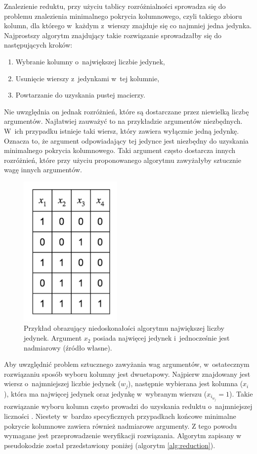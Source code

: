 Znalezienie reduktu,
przy użyciu tablicy rozróżnialności sprowadza się do problemu znalezienia minimalnego pokrycia kolumnowego,
czyli takiego zbioru kolumn,
dla którego w~każdym z~wierszy znajduje się co najmniej jedna jedynka.
Najprostszy algorytm znajdujący takie rozwiązanie sprowadzałby się do następujących kroków:
\begin{enumerate}
\item Wybranie kolumny o~największej liczbie jedynek,
\item Usunięcie wierszy z~jedynkami w~tej kolumnie,
\item Powtarzanie do uzyskania pustej macierzy.
\end{enumerate}

Nie uwzględnia on jednak rozróżnień,
które są dostarczane przez niewielką liczbę argumentów.
Najłatwiej zauważyć to na przykładzie argumentów niezbędnych.
W~ich przypadku istnieje taki wiersz,
który zawiera wyłącznie jedną jedynkę.
Oznacza to,
że argument odpowiadający tej jedynce jest niezbędny do uzyskania minimalnego pokrycia kolumnowego.
Taki argument często dostarcza innych rozróżnień,
które przy użyciu proponowanego algorytmu zawyżałyby sztucznie wagę innych argumentów.

\begin{figure}[H]
\centering
\includegraphics[width = 5cm]{chapter02/required-arguments.png}
\caption{Przykład obrazujący niedoskonałości algorytmu największej liczby jedynek.
Argument $x_2$ posiada najwięcej jedynek i~jednocześnie jest nadmiarowy (źródło własne).}
\end{figure}

Aby uwzględnić problem sztucznego zawyżania wag argumentów,
w~ostatecznym rozwiązaniu sposób wyboru kolumny jest dwuetapowy.
Najpierw znajdowany jest wiersz o~najmniejszej liczbie jedynek ($w_j$),
następnie wybierana jest kolumna ($x_i$),
która ma najwięcej jedynek oraz jedynkę w~wybranym wierszu ($x_{i_{w_j}} = 1$).
Takie rozwiązanie wyboru kolumn często prowadzi do uzyskania reduktu o~najmniejszej liczności \cite{unate-artykul}.
Niestety w~bardzo specyficznych przypadkach końcowe minimalne pokrycie kolumnowe zawiera również nadmiarowe argumenty.
Z tego powodu wymagane jest przeprowadzenie weryfikacji rozwiązania.
Algorytm zapisany w pseudokodzie został przedstawiony poniżej (algorytm \ref{alg:reduction}).

